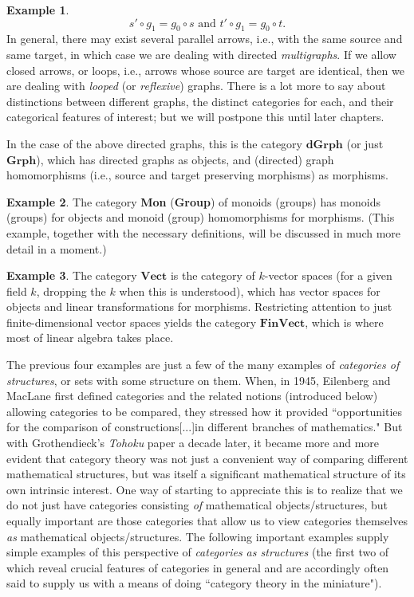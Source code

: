 \documentclass[a4paper]{book}
\theoremstyle{definition}
\newtheorem{example}{Example}[section]
\theoremstyle{definition}
\theoremstyle{definition}
\theoremstyle{theorem}
\theoremstyle{definition}
\begin{document}
\begin{example}
\begin{equation*}
s' \circ g_1 = g_0 \circ s \text{ and } t' \circ g_1 = g_0 \circ t.
\end{equation*}
In general, there may exist several parallel arrows, i.e., with the same source and same target, in which case we are dealing with directed \textit{multigraphs}. If we allow closed arrows, or loops, i.e., arrows whose source are target are identical, then we are dealing with \textit{looped} (or \textit{reflexive}) graphs. There is a lot more to say about distinctions between different graphs, the distinct categories for each, and their categorical features of interest; but we will postpone this until later chapters. \par 
In the case of the above directed graphs, this is the category $\textbf{dGrph}$ (or just $\textbf{Grph}$), which has directed graphs as objects, and (directed) graph homomorphisms (i.e., source and target preserving morphisms) as morphisms.    
\end{example}
\begin{example}
	The category \textbf{Mon} (\textbf{Group}) of monoids (groups)   has monoids (groups) for objects and monoid (group) homomorphisms for morphisms. (This example, together with the necessary definitions, will be discussed in much more detail in a moment.)
\end{example}
\begin{example}
	The category $\textbf{Vect}$  is the category of $k$-vector spaces (for a given field $k$, dropping the $k$ when this is understood), which has vector spaces for objects and linear transformations for morphisms. Restricting attention to just finite-dimensional vector spaces yields the category $\textbf{FinVect}$, which is where most of linear algebra takes place.   
\end{example}
The previous four examples are just a few of the many examples of \textit{categories of structures}, or sets with some structure on them. When, in 1945, Eilenberg and MacLane first defined categories and the related notions (introduced below) allowing categories to be compared, they stressed how it provided ``opportunities for the comparison of constructions[...]in different branches of mathematics." But with Grothendieck's \textit{Tohoku} paper a decade later, it became more and more evident that category theory was not just a convenient way of comparing different mathematical structures, but was itself a significant mathematical structure of its own intrinsic interest. One way of starting to appreciate this is to realize that we do not just have categories consisting \textit{of} mathematical objects/structures, but equally important are those categories that allow us to view categories themselves \textit{as} mathematical objects/structures. The following important examples supply simple examples of this perspective of \textit{categories as structures} (the first two of which reveal crucial features of categories in general and are accordingly often said to supply us with a means of doing ``category theory in the miniature").  
\end{document}
